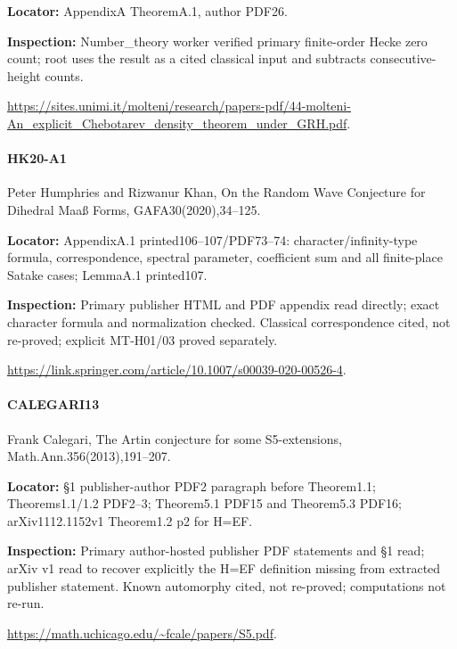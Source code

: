 \documentclass[11pt,a4paper]{article}
\begin{document}
\textbf{Locator:} AppendixA TheoremA.\allowbreak{}1, author PDF26.

\textbf{Inspection:} Number\_\allowbreak{}theory worker verified primary finite-order Hecke zero count; root uses the result as a cited classical input and subtracts consecutive-height counts.\allowbreak{}

\url{https://sites.unimi.it/molteni/research/papers-pdf/44-molteni-An_explicit_Chebotarev_density_theorem_under_GRH.pdf}.

\paragraph{HK20-A1} Peter Humphries and Rizwanur Khan, On the Random Wave Conjecture for Dihedral Maaß Forms, GAFA30(2020),34–\allowbreak{}125.

\textbf{Locator:} AppendixA.\allowbreak{}1 printed106–\allowbreak{}107/\allowbreak{}PDF73–\allowbreak{}74:\allowbreak{} character/\allowbreak{}infinity-type formula, correspondence, spectral parameter, coefficient sum and all finite-place Satake cases; LemmaA.\allowbreak{}1 printed107.

\textbf{Inspection:} Primary publisher HTML and PDF appendix read directly; exact character formula and normalization checked.\allowbreak{} Classical correspondence cited, not re-proved; explicit MT-H01/\allowbreak{}03 proved separately.\allowbreak{}

\url{https://link.springer.com/article/10.1007/s00039-020-00526-4}.

\paragraph{CALEGARI13} Frank Calegari, The Artin conjecture for some S5-extensions, Math.\allowbreak{}Ann.\allowbreak{}356(2013),191–\allowbreak{}207.

\textbf{Locator:} §1 publisher-author PDF2 paragraph before Theorem1.\allowbreak{}1; Theorems1.\allowbreak{}1/\allowbreak{}1.\allowbreak{}2 PDF2–\allowbreak{}3; Theorem5.\allowbreak{}1 PDF15 and Theorem5.\allowbreak{}3 PDF16; arXiv1112.\allowbreak{}1152v1 Theorem1.\allowbreak{}2 p2 for H=EF.

\textbf{Inspection:} Primary author-hosted publisher PDF statements and §1 read; arXiv v1 read to recover explicitly the H=EF definition missing from extracted publisher statement.\allowbreak{} Known automorphy cited, not re-proved; computations not re-run.\allowbreak{}

\url{https://math.uchicago.edu/~fcale/papers/S5.pdf}.
\end{document}
